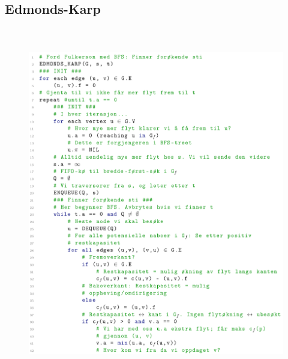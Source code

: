 \documentclass[12pt]{report}
\begin{document}




\newpage
\par

\subsection*{Edmonds-Karp}



\begin{figure}[H]
	\begin{Center}
		\includegraphics[width=5.1in,height=6.05in]{./media/image205.png}
	\end{Center}
\end{figure}



\par
\end{document}
